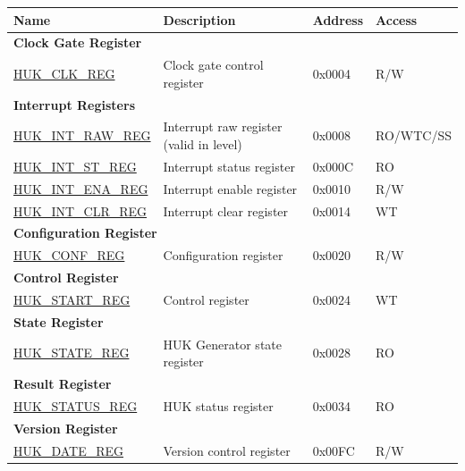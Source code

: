 \begin{longtable}{ | p{6cm} | p{7.2cm} | p{1.3cm} | p{1cm} | }
\hline\rowcolor{lightgray}
\textbf{Name} & \textbf{Description} &  \textbf{Address} & \textbf{Access} \\ \hline
\endhead
\multicolumn{4}{|l|}{\textbf{Clock Gate Register}} \\ \hline
\hyperref[regdesc:HUKCLKREG]{HUK\_CLK\_REG} & Clock gate control register & 0x0004 & R/W \\ \hline
\multicolumn{4}{|l|}{\textbf{Interrupt Registers}} \\ \hline
\hyperref[regdesc:HUKINTRAWREG]{HUK\_INT\_RAW\_REG} & Interrupt raw register (valid in level) & 0x0008 & RO/WTC/SS \\ \hline
\hyperref[regdesc:HUKINTSTREG]{HUK\_INT\_ST\_REG} & Interrupt status register & 0x000C & RO \\ \hline
\hyperref[regdesc:HUKINTENAREG]{HUK\_INT\_ENA\_REG} & Interrupt enable register & 0x0010 & R/W \\ \hline
\hyperref[regdesc:HUKINTCLRREG]{HUK\_INT\_CLR\_REG} & Interrupt clear register & 0x0014 & WT \\ \hline
\multicolumn{4}{|l|}{\textbf{Configuration Register}} \\ \hline
\hyperref[regdesc:HUKCONFREG]{HUK\_CONF\_REG} & Configuration register & 0x0020 & R/W \\ \hline
\multicolumn{4}{|l|}{\textbf{Control Register}} \\ \hline
\hyperref[regdesc:HUKSTARTREG]{HUK\_START\_REG} & Control register & 0x0024 & WT \\ \hline
\multicolumn{4}{|l|}{\textbf{State Register}} \\ \hline
\hyperref[regdesc:HUKSTATEREG]{HUK\_STATE\_REG} & HUK Generator state register & 0x0028 & RO \\ \hline
\multicolumn{4}{|l|}{\textbf{Result Register}} \\ \hline
\hyperref[regdesc:HUKSTATUSREG]{HUK\_STATUS\_REG} & HUK status register & 0x0034 & RO \\ \hline
\multicolumn{4}{|l|}{\textbf{Version Register}} \\ \hline
\hyperref[regdesc:HUKDATEREG]{HUK\_DATE\_REG} & Version control register & 0x00FC & R/W \\ \hline
\end{longtable}